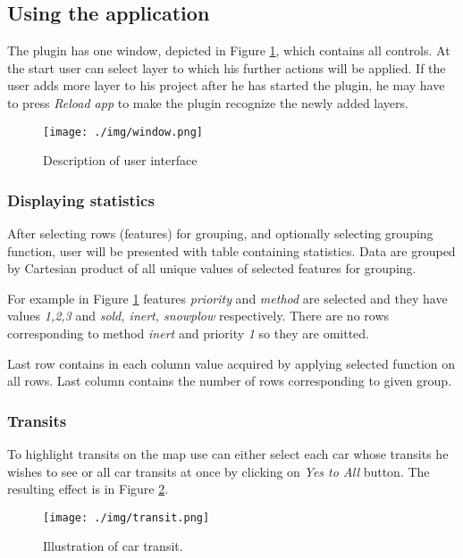 \documentclass[12pt,a4paper]{article}
\begin{document}
\subsection{Using the application}
The plugin has one window, depicted in Figure \ref{window}, which contains all controls.
At the start user can select layer to which his further actions will be applied.
If the user adds more layer to his project after he has started the plugin, he may have to press \emph{Reload app} to make the plugin recognize the newly added layers.

\begin{figure}[H]\centering
\texttt{[image: ./img/window.png]}
\caption{Description of user interface}
\label{window}
\end{figure}

\subsubsection{Displaying statistics}
After selecting rows (features) for grouping, and optionally selecting grouping function, user will be presented with table containing statistics.
Data are grouped by Cartesian product of all unique values of selected features for grouping. 

\par For example in Figure \ref{window} features \emph{priority} and \emph{method} are selected and they have values \emph{1,2,3} and \emph{sold, inert, snowplow} respectively.
There are no rows corresponding to method \emph{inert} and priority \emph{1} so they are omitted.

\par Last row contains in each column value acquired by applying selected function on all rows.
Last column contains the number of rows corresponding to given group.

\subsubsection{Transits}
To highlight transits on the map use can either select each car whose transits he wishes to see or all car transits at once by clicking on \emph{Yes to All} button.
The resulting effect is in Figure \ref{transit}.

\begin{figure}[H]\centering
\texttt{[image: ./img/transit.png]}
\caption{Illustration of car transit.}
\label{transit}
\end{figure}
\end{document}
